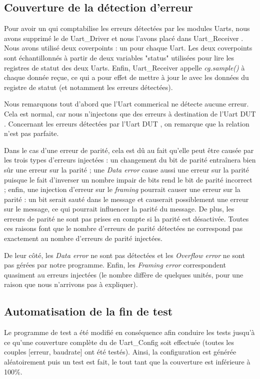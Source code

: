 \documentclass[12pt, titlepage]{article}
\newcommand{\udriver}{Uart\_Driver }
\newcommand{\ureceiver}{Uart\_Receiver }
\newcommand{\uconfig}{Uart\_Config }
\newcommand{\theDut}{Uart DUT }
\newcommand{\ucom}{Uart commerical }
\begin{document}
    \subsection{Couverture de la détection d'erreur} 
		Pour avoir un \cvg qui comptabilise les erreurs détectées par les modules Uarts, nous avons supprimé le \cvg de \udriver et nous l'avons placé dans \ureceiver. Nous avons utilisé deux coverpoints : un pour chaque Uart. Les deux coverpoints sont échantillonnés à partir de deux variables "status" utilisées pour lire les registres de statut des deux Uarts. Enfin, \ureceiver appelle \emph{cg.sample()} à chaque donnée reçue, ce qui a pour effet de mettre à jour le \cvg avec les données du registre de statut (et notamment les erreurs détectées).

		Nous remarquons tout d'abord que l'\ucom ne détecte aucune erreur. Cela est normal, car nous n'injectons que des erreurs à destination de l'\theDut. Concernant les erreurs détectées par l'\theDut, on remarque que la relation n'est pas parfaite. 
        
        Dans le cas d'une erreur de parité, cela est dû au fait qu'elle peut être causée par les trois types d'erreurs injectées : un changement du bit de parité entraînera bien sûr une erreur sur la parité ; une \emph{Data error} cause aussi une erreur sur la parité puisque le fait d'inverser un nombre impair de bits rend le bit de parité incorrect ; enfin, une injection d'erreur sur le \emph{framing} pourrait causer une erreur sur la parité : un bit serait sauté dans le message et causerait possiblement une erreur sur le message, ce qui pourrait influencer la parité du message. De plus, les erreurs de parité ne sont pas prises en compte si la parité est désactivée. Toutes ces raisons font que le nombre d'erreurs de parité détectées ne correspond pas exactement au nombre d'erreurs de parité injectées. 
        
        De leur côté, les \emph{Data error} ne sont pas détectées et les \emph{Overflow error} ne sont pas gérées par notre programme. Enfin, les \emph{Framing error} correspondent quasiment au erreurs injectées (le nombre diffère de quelques unités, pour une raison que nous n'arrivons pas à expliquer).
		
    \subsection{Automatisation de la fin de test} 
    	 Le programme de test a été modifié en conséquence afin conduire les tests jusqu'à ce qu'une couverture complète du \cvg de \uconfig soit effectuée (toutes les couples [erreur, baudrate] ont été testés). Ainsi, la configuration est générée aléatoirement puis un test est fait, le tout tant que la couverture est inférieure à 100\%.
		
\end{document}
